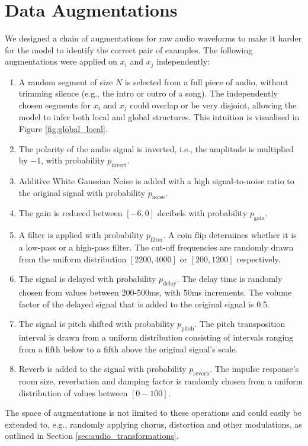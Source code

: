 \section{Data Augmentations}
We designed a chain of augmentations for raw audio waveforms to make it harder for the model to identify the correct pair of examples.
The following augmentations were applied on ${x_i}$ and ${x_j}$ independently:
\begin{enumerate}
    \item A random segment of size $N$ is selected from a full piece of audio, without trimming silence (e.g., the intro or outro of a song).
    The independently chosen segments for $x_i$ and $x_j$ could overlap or be very disjoint, allowing the model to infer both local and global structures. This intuition is visualised in Figure \ref{fig:global_local}.
    \item The polarity of the audio signal is inverted, i.e., the amplitude is multiplied by $-1$, with probability $p_{\mathrm{invert}}$.
    \item Additive White Gaussian Noise is added with a high signal-to-noise ratio to the original signal with probability $p_{\mathrm{noise}}$.
    \item The gain is reduced between $[-6, 0]$ decibels with probability $p_{\mathrm{gain}}$.
    \item A filter is applied with probability $p_{\mathrm{filter}}$.
    A coin flip determines whether it is a low-pass or a high-pass filter. The cut-off frequencies are randomly drawn from the uniform distribution $[2200, 4000]$ or $[200,1200]$ respectively.
    \item The signal is delayed with probability $p_{\mathrm{delay}}$.
The delay time is randomly chosen from values between 200-500ms, with 50ms increments.
The volume factor of the delayed signal that is added to the original signal is 0.5.
    \item The signal is pitch shifted with probability $p_{\mathrm{pitch}}$.
The pitch transposition interval is drawn from a uniform distribution consisting of intervals ranging from a fifth below to a fifth above the original signal's scale.
    \item Reverb is added to the signal with probability $p_{\mathrm{reverb}}$.
The impulse response's room size, reverbation and damping factor is randomly chosen from a uniform distribution of values between $[0-100]$.
\end{enumerate}
The space of augmentations is not limited to these operations and could easily be extended to, e.g., randomly applying chorus, distortion and other modulations, as outlined in Section \ref{sec:audio_transformations}.




